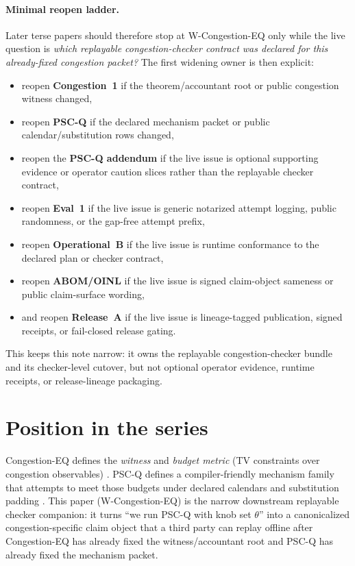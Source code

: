\documentclass[11pt]{article}
\begin{document}
\paragraph{Minimal reopen ladder.}
Later terse papers should therefore stop at W-Congestion-EQ only while the live question is \emph{which replayable congestion-checker contract was declared for this already-fixed congestion packet?}
The first widening owner is then explicit:
\begin{itemize}[leftmargin=*]
\item reopen \textbf{Congestion~1} if the theorem/accountant root or public congestion witness changed,\cite{series:congeq}
\item reopen \textbf{PSC-Q} if the declared mechanism packet or public calendar/substitution rows changed,\cite{series:pscq}
\item reopen the \textbf{PSC-Q addendum} if the live issue is optional supporting evidence or operator caution slices rather than the replayable checker contract,\cite{series:pscqaddendum}
\item reopen \textbf{Eval~1} if the live issue is generic notarized attempt logging, public randomness, or the gap-free attempt prefix,\cite{series:evalnotary}
\item reopen \textbf{Operational~B} if the live issue is runtime conformance to the declared plan or checker contract,\cite{series:operationalB}
\item reopen \textbf{ABOM/OINL} if the live issue is signed claim-object sameness or public claim-surface wording,\cite{series:abom}
\item and reopen \textbf{Release~A} if the live issue is lineage-tagged publication, signed receipts, or fail-closed release gating.\cite{series:release}
\end{itemize}
This keeps this note narrow: it owns the replayable congestion-checker bundle and its checker-level cutover, but not optional operator evidence, runtime receipts, or release-lineage packaging.

\section{Position in the series}
Congestion-EQ defines the \emph{witness} and \emph{budget metric} (TV constraints over congestion observables) \cite{series:congeq}.
PSC-Q defines a compiler-friendly mechanism family that attempts to meet those budgets under declared calendars and substitution padding \cite{series:pscq}.
This paper (W-Congestion-EQ) is the narrow downstream replayable checker companion: it turns ``we run PSC-Q with knob set $\theta$'' into a canonicalized congestion-specific claim object that a third party can replay offline after Congestion-EQ has already fixed the witness/accountant root and PSC-Q has already fixed the mechanism packet.
\end{document}
